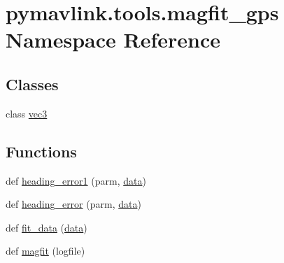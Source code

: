 \hypertarget{namespacepymavlink_1_1tools_1_1magfit__gps}{}\section{pymavlink.\+tools.\+magfit\+\_\+gps Namespace Reference}
\label{namespacepymavlink_1_1tools_1_1magfit__gps}
\subsection*{Classes}
\begin{DoxyCompactItemize}
\item 
class \mbox{\hyperlink{classpymavlink_1_1tools_1_1magfit__gps_1_1vec3}{vec3}}
\end{DoxyCompactItemize}
\subsection*{Functions}
\begin{DoxyCompactItemize}
\item 
def \mbox{\hyperlink{namespacepymavlink_1_1tools_1_1magfit__gps_a5b1cc8396c886f644e91b514d65ffb02}{heading\+\_\+error1}} (parm, \mbox{\hyperlink{structdata}{data}})
\item 
def \mbox{\hyperlink{namespacepymavlink_1_1tools_1_1magfit__gps_a94af16fde025706f3ef8ee9e8757419b}{heading\+\_\+error}} (parm, \mbox{\hyperlink{structdata}{data}})
\item 
def \mbox{\hyperlink{namespacepymavlink_1_1tools_1_1magfit__gps_a09e741bd02076ffe51d5f7c63a060a89}{fit\+\_\+data}} (\mbox{\hyperlink{structdata}{data}})
\item 
def \mbox{\hyperlink{namespacepymavlink_1_1tools_1_1magfit__gps_a0d9ad9596239f056f8067ad0aa07409a}{magfit}} (logfile)
\end{DoxyCompactItemize}
